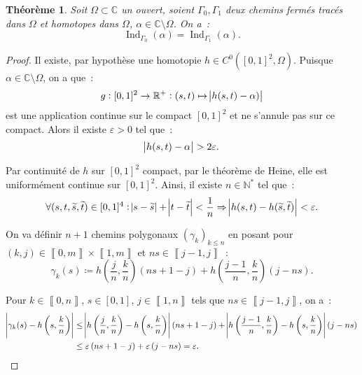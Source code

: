 \documentclass{report}
\newtheorem{thm}{Théorème}[chapter]
\theoremstyle{definition}
\theoremstyle{remark}
\numberwithin{equation}{section}
\newcommand{\C}{\mathbb C}
\newcommand{\R}{\mathbb R}
\newcommand{\N}{\mathbb N}
\newcommand{\Ns}{\N^{*}}
\DeclareMathOperator{\Ind}{Ind}
\newcommand{\intint}[2]{\left\llbracket#1, #2\right\rrbracket}
\begin{document}
			\begin{thm}\label{thm:Indice constant chemins homotopes} Soit $\Omega \subset \C$ un ouvert, soient $\Gamma_0, \Gamma_1$ deux chemins fermés tracés
			dans $\Omega$ et homotopes dans $\Omega$, $\alpha \in \C \setminus \Omega$. On a~:
			\begin{equation}
				\Ind_{\Gamma_0}(\alpha) = \Ind_{\Gamma_1}(\alpha).
			\end{equation}
			\end{thm}

			\begin{proof} Il existe, par hypothèse une homotopie $h \in C^0([0, 1]^2, \Omega)$. Puisque $\alpha \in \C \setminus \Omega$, on a que~:
			\begin{equation}
				g : [0, 1]^2 \to \R^+ : (s, t) \mapsto \abs {h(s, t)-\alpha)}
			\end{equation}
			est une application continue sur le compact $[0, 1]^2$ et ne s'annule pas sur ce compact. Alors il existe $\varepsilon > 0$ tel que~:
			\begin{equation}
				\abs {h(s, t) - \alpha} > 2\varepsilon.
			\end{equation}

			Par continuité de $h$ sur $[0, 1]^2$ compact, par le théorème de Heine, elle est uniformément continue sur $[0, 1]^2$. Ainsi, il existe $n \in \Ns$ tel que~:
			\begin{equation}
				\forall (s, t, \widetilde s, \widetilde t) \in [0, 1]^4 : \abs {s - \widetilde s} + \abs {t - \widetilde t} < \frac 1n
					\Rightarrow \abs {h(s, t) - h(\widetilde s, \widetilde t)} < \varepsilon.
			\end{equation}

			On va définir $n+1$ chemins polygonaux $(\gamma_k)_{k \leq n}$ en posant pour $(k, j) \in \intint 0m \times \intint 1m$ et $ns \in \intint {j-1}j$~:
			\begin{equation}
				\gamma_k(s) \coloneqq h\left(\frac jn, \frac kn\right)\left(ns + 1 - j\right) + h\left(\frac {j-1}n, \frac kn\right)\left(j-ns\right).
			\end{equation}

			Pour $k \in \intint 0n$, $s \in [0, 1]$, $j \in \intint 1n$ tels que $ns \in \intint {j-1}j$, on a~:
			\begin{align}
				\abs {\gamma_k(s) - h\left(s, \frac kn\right)} &\leq \abs {h\left(\frac jn, \frac kn\right) - h\left(s, \frac kn\right)}\left(ns + 1 - j\right)
					+ \abs {h\left(\frac {j-1}n, \frac kn\right) - h\left(s, \frac kn\right)}\left(j-ns\right) \\
				&\leq \varepsilon\left(ns+1-j\right) + \varepsilon\left(j-ns\right) = \varepsilon.
			\end{align}


\end{proof}
\end{document}
